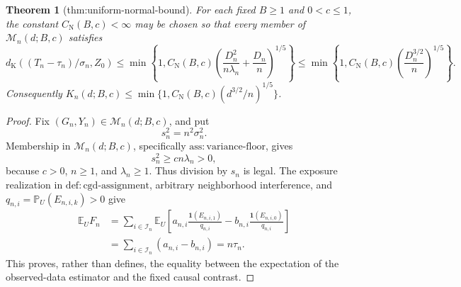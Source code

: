 \documentclass{article}
\newtheorem{theorem}{Theorem}
\begin{document}
\begin{theorem}[thm:uniform-normal-bound]\label{thm:uniform-normal-bound}
For each fixed \(B\ge1\) and \(0<c\le1\), the constant \(C_{\mathrm N}(B,c)<\infty\) may be chosen so that every member of \(\mathcal M_n(d;B,c)\) satisfies \[d_{\mathrm K}((T_n-\tau_n)/\sigma_n,Z_0)\le\min\left\{1,C_{\mathrm N}(B,c)\left(\frac{D_n^2}{n\lambda_n}+\frac{D_n}{n}\right)^{1/5}\right\}\le\min\left\{1,C_{\mathrm N}(B,c)\left(\frac{D_n^{3/2}}n\right)^{1/5}\right\}.\] Consequently \(K_n(d;B,c)\le\min\{1,C_{\mathrm N}(B,c)(d^{3/2}/n)^{1/5}\}\).
\end{theorem}
\begin{proof}
Fix \((G_n,Y_n)\in\mathcal M_n(d;B,c)\), and put
\[
 s_n^2=n^2\sigma_n^2.
\]
Membership in \(\mathcal M_n(d;B,c)\), specifically \(\mathrm{ass:variance\text{-}floor}\), gives
\[
 s_n^2\ge c n\lambda_n>0,
\]
because \(c>0\), \(n\ge1\), and \(\lambda_n\ge1\).  Thus division by \(s_n\) is legal.  The exposure realization in \(\mathrm{def:cgd\text{-}assignment}\), arbitrary neighborhood interference, and \(q_{n,i}=\mathbb P_U(E_{n,i,k})>0\) give
\[
 \begin{aligned}
 \mathbb E_UF_n
 &=\sum_{i\in\mathcal I_n}\mathbb E_U\left[
 a_{n,i}\frac{\mathbf 1(E_{n,i,1})}{q_{n,i}}
 -b_{n,i}\frac{\mathbf 1(E_{n,i,0})}{q_{n,i}}
 \right]\\
 &=\sum_{i\in\mathcal I_n}(a_{n,i}-b_{n,i})
 =n\tau_n.
 \end{aligned}
\]
This proves, rather than defines, the equality between the expectation of the observed-data estimator and the fixed causal contrast.


\end{proof}
\end{document}
